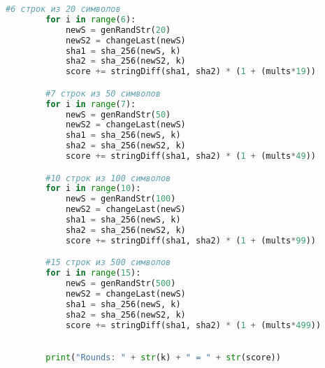 \documentclass[12pt]{article}
\begin{document}
\begin{lstlisting}[language=Python]
        #6 строк из 20 символов
        for i in range(6):
            newS = genRandStr(20)
            newS2 = changeLast(newS)
            sha1 = sha_256(newS, k)
            sha2 = sha_256(newS2, k)
            score += stringDiff(sha1, sha2) * (1 + (mults*19))

        #7 строк из 50 символов
        for i in range(7):
            newS = genRandStr(50)
            newS2 = changeLast(newS)
            sha1 = sha_256(newS, k)
            sha2 = sha_256(newS2, k)
            score += stringDiff(sha1, sha2) * (1 + (mults*49))

        #10 строк из 100 символов
        for i in range(10):
            newS = genRandStr(100)
            newS2 = changeLast(newS)
            sha1 = sha_256(newS, k)
            sha2 = sha_256(newS2, k)
            score += stringDiff(sha1, sha2) * (1 + (mults*99))

        #15 строк из 500 символов
        for i in range(15):
            newS = genRandStr(500)
            newS2 = changeLast(newS)
            sha1 = sha_256(newS, k)
            sha2 = sha_256(newS2, k)
            score += stringDiff(sha1, sha2) * (1 + (mults*499))

        
        print("Rounds: " + str(k) + " = " + str(score))
    
\end{lstlisting}
\end{document}

